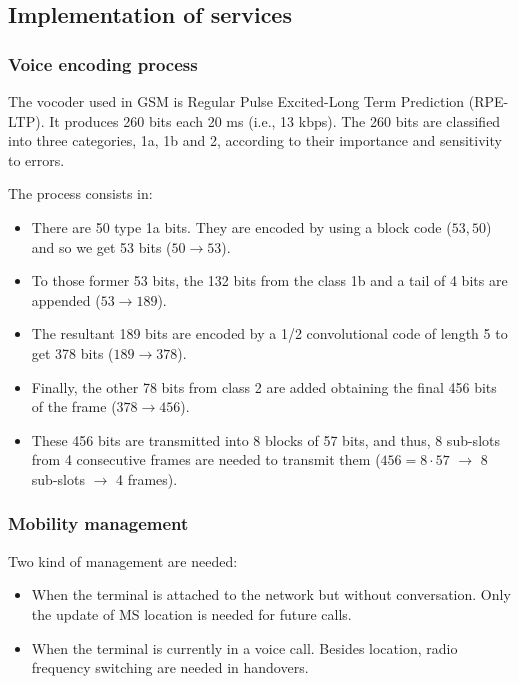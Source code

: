 \documentclass[
	12pt,
	twoside
]{book}
\begin{document}
\subsection{Implementation of services}

\subsubsection{Voice encoding process}

The vocoder used in GSM is Regular Pulse Excited-Long Term Prediction (RPE-LTP). It produces 260 bits each 20 ms (i.e., 13 kbps). The 260 bits are classified into three categories, 1a, 1b and 2, according to their importance and sensitivity to errors.

The process consists in:
\begin{itemize}
	\item There are 50 type 1a bits. They are encoded by using a block code ($53, 50$) and so we get 53 bits ($50 \rightarrow 53$).
	\item To those former 53 bits, the 132 bits from the class 1b and a tail of 4 bits are appended ($53 \rightarrow 189$).
	\item The resultant 189 bits are encoded by a 1/2 convolutional code of length 5 to get 378 bits ($189 \rightarrow 378$).
	\item Finally, the other 78 bits from class 2 are added obtaining the final 456 bits of the frame ($378 \rightarrow 456$).
	\item These 456 bits are transmitted into 8 blocks of 57 bits, and thus, 8 sub-slots from 4 consecutive frames are needed to transmit them ($456 = 8 \cdot 57$ $\rightarrow$ 8 sub-slots $\rightarrow$ 4 frames).
\end{itemize}

\subsubsection{Mobility management}

Two kind of management are needed:
\begin{itemize}
	\item When the terminal is attached to the network but without conversation. Only the update of MS location is needed for future calls.
	\item When the terminal is currently in a voice call. Besides location, radio frequency switching are needed in handovers.
\end{itemize}
\end{document}
